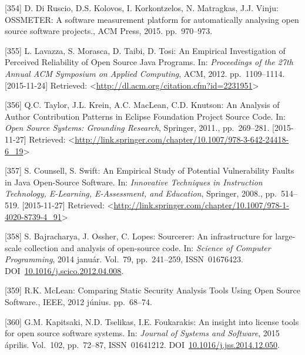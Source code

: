 \documentclass[12pt,magyar,a4paper,oneside]{scrreprt}
\begin{document}
\leavevmode\hypertarget{ref-di_ruscio_ossmeter_2015}{}%
{[}354{]} D. Di Ruscio, D.S. Kolovos, I. Korkontzelos, N. Matragkas,
J.J. Vinju: OSSMETER: A software measurement platform for automatically
analysing open source software projects., ACM Press, 2015. pp.~970--973.

\leavevmode\hypertarget{ref-lavazza_empirical_2012}{}%
{[}355{]} L. Lavazza, S. Morasca, D. Taibi, D. Tosi: An Empirical
Investigation of Perceived Reliability of Open Source Java Programs. In:
\emph{Proceedings of the 27th Annual ACM Symposium on Applied
Computing}, ACM, 2012. pp.~1109--1114. {[}2015-11-24{]} Retrieved:
\textless{}\url{http://dl.acm.org/citation.cfm?id=2231951}\textgreater{}

\leavevmode\hypertarget{ref-taylor_analysis_2011}{}%
{[}356{]} Q.C. Taylor, J.L. Krein, A.C. MacLean, C.D. Knutson: An
Analysis of Author Contribution Patterns in Eclipse Foundation Project
Source Code. In: \emph{Open Source Systems: Grounding Research},
Springer, 2011., pp.~269--281. {[}2015-11-27{]} Retrieved:
\textless{}\url{http://link.springer.com/chapter/10.1007/978-3-642-24418-6_19}\textgreater{}

\leavevmode\hypertarget{ref-counsell_empirical_2008}{}%
{[}357{]} S. Counsell, S. Swift: An Empirical Study of Potential
Vulnerability Faults in Java Open-Source Software. In: \emph{Innovative
Techniques in Instruction Technology, E-Learning, E-Assessment, and
Education}, Springer, 2008., pp.~514--519. {[}2015-11-27{]} Retrieved:
\textless{}\url{http://link.springer.com/chapter/10.1007/978-1-4020-8739-4_91}\textgreater{}

\leavevmode\hypertarget{ref-bajracharya_sourcerer_2014}{}%
{[}358{]} S. Bajracharya, J. Ossher, C. Lopes: Sourcerer: An
infrastructure for large-scale collection and analysis of open-source
code. In: \emph{Science of Computer Programming}, 2014 január. Vol.~79,
pp.~241--259, ISSN~01676423.
DOI~\href{https://doi.org/10.1016/j.scico.2012.04.008}{10.1016/j.scico.2012.04.008}.

\leavevmode\hypertarget{ref-mclean_comparing_2012}{}%
{[}359{]} R.K. McLean: Comparing Static Security Analysis Tools Using
Open Source Software., IEEE, 2012 június. pp.~68--74.

\leavevmode\hypertarget{ref-kapitsaki_insight_2015}{}%
{[}360{]} G.M. Kapitsaki, N.D. Tselikas, I.E. Foukarakis: An insight
into license tools for open source software systems. In: \emph{Journal
of Systems and Software}, 2015 április. Vol.~102, pp.~72--87,
ISSN~01641212.
DOI~\href{https://doi.org/10.1016/j.jss.2014.12.050}{10.1016/j.jss.2014.12.050}.
\end{document}
